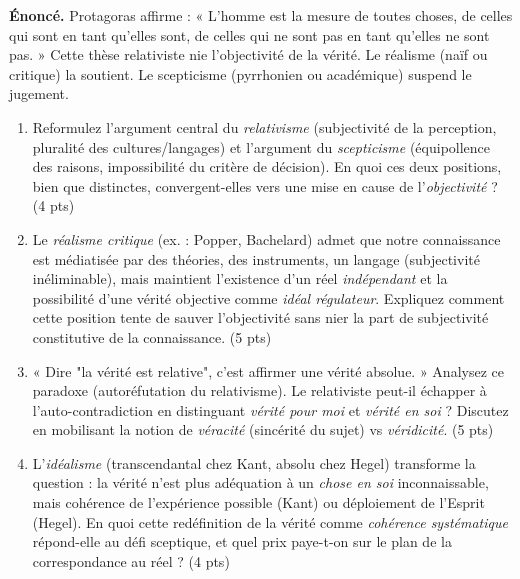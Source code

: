 \documentclass[11pt]{article}
\begin{document}
\begin{exercice}
\textbf{Énoncé.} Protagoras affirme : « L'homme est la mesure de toutes choses, de celles qui sont en tant qu'elles sont, de celles qui ne sont pas en tant qu'elles ne sont pas. » Cette thèse relativiste nie l'objectivité de la vérité. Le réalisme (naïf ou critique) la soutient. Le scepticisme (pyrrhonien ou académique) suspend le jugement.

\begin{enumerate}
    \item Reformulez l'argument central du \textit{relativisme} (subjectivité de la perception, pluralité des cultures/langages) et l'argument du \textit{scepticisme} (équipollence des raisons, impossibilité du critère de décision). En quoi ces deux positions, bien que distinctes, convergent-elles vers une mise en cause de l'\textit{objectivité} ? (4 pts)
    \item Le \textit{réalisme critique} (ex. : Popper, Bachelard) admet que notre connaissance est médiatisée par des théories, des instruments, un langage (subjectivité inéliminable), mais maintient l'existence d'un réel \textit{indépendant} et la possibilité d'une vérité objective comme \textit{idéal régulateur}. Expliquez comment cette position tente de sauver l'objectivité sans nier la part de subjectivité constitutive de la connaissance. (5 pts)
    \item « Dire "la vérité est relative", c'est affirmer une vérité absolue. » Analysez ce paradoxe (autoréfutation du relativisme). Le relativiste peut-il échapper à l'auto-contradiction en distinguant \textit{vérité pour moi} et \textit{vérité en soi} ? Discutez en mobilisant la notion de \textit{véracité} (sincérité du sujet) vs \textit{véridicité}. (5 pts)
    \item L'\textit{idéalisme} (transcendantal chez Kant, absolu chez Hegel) transforme la question : la vérité n'est plus adéquation à un \textit{chose en soi} inconnaissable, mais cohérence de l'expérience possible (Kant) ou déploiement de l'Esprit (Hegel). En quoi cette redéfinition de la vérité comme \textit{cohérence systématique} répond-elle au défi sceptique, et quel prix paye-t-on sur le plan de la correspondance au réel ? (4 pts)
\end{enumerate}
\end{exercice}
\end{document}

